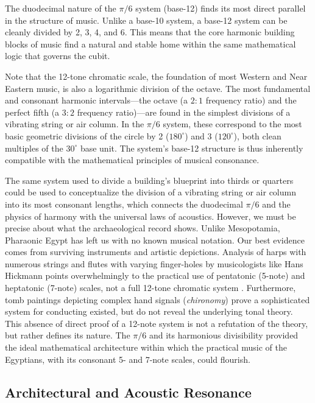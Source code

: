 \documentclass[11pt]{article}
\begin{document}
The duodecimal nature of the $\pi/6$ system (base-12) finds its most direct parallel in the structure of music. Unlike a base-10 system, a base-12 system can be cleanly divided by 2, 3, 4, and 6. This means that the core harmonic building blocks of music find a natural and stable home within the same mathematical logic that governs the cubit.

Note that the 12-tone chromatic scale, the foundation of most Western and Near Eastern music, is also a logarithmic division of the octave. The most fundamental and consonant harmonic intervals---the octave (a $2:1$ frequency ratio) and the perfect fifth (a $3:2$ frequency ratio)---are found in the simplest divisions of a vibrating string or air column. In the $\pi/6$ system, these correspond to the most basic geometric divisions of the circle by 2 ($180^\circ$) and 3 ($120^\circ$), both clean multiples of the $30^\circ$ base unit. The system's base-12 structure is thus inherently compatible with the mathematical principles of musical consonance.

 The same system used to divide a building's blueprint into thirds or quarters could be used to conceptualize the division of a vibrating string or air column into its most consonant lengths, which connects the duodecimal $\pi/6$ and the physics of harmony with the universal laws of acoustics. However, we must be precise about what the archaeological record shows. Unlike Mesopotamia, Pharaonic Egypt has left us with no known musical notation. Our best evidence comes from surviving instruments and artistic depictions. Analysis of harps with numerous strings and flutes with varying finger-holes by musicologists like Hans Hickmann points overwhelmingly to the practical use of pentatonic (5-note) and heptatonic (7-note) scales, not a full 12-tone chromatic system \cite{hickmann1957music}. Furthermore, tomb paintings depicting complex hand signals (\textit{chironomy}) prove a sophisticated system for conducting existed, but do not reveal the underlying tonal theory. This absence of direct proof of a 12-note system is not a refutation of the theory, but rather defines its nature. The $\pi/6$ and its harmonious divisibility provided the ideal mathematical architecture within which the practical music of the Egyptians, with its consonant 5- and 7-note scales, could flourish.

\subsection{Architectural and Acoustic Resonance}
\end{document}
